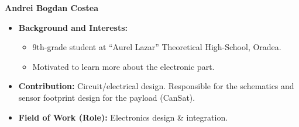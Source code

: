 \item[] \textbf{Andrei Bogdan Costea}
    \begin{itemize}[label=]
        \item[\faGraduationCap] \textbf{Background and Interests:} 
        \begin{itemize}[label=\textbullet]
            \item 9th-grade student at “Aurel Lazar” Theoretical High-School, Oradea.
            \item Motivated to learn more about the electronic part.
        \end{itemize}
        \item[\faEdit] \textbf{Contribution:} Circuit/electrical design. Responsible for the schematics and sensor footprint design for the payload (CanSat).
        \item[\faMicroscope] \textbf{Field of Work (Role):} Electronics design \& integration.
    \end{itemize}
    \vspace{0.2 cm}
    